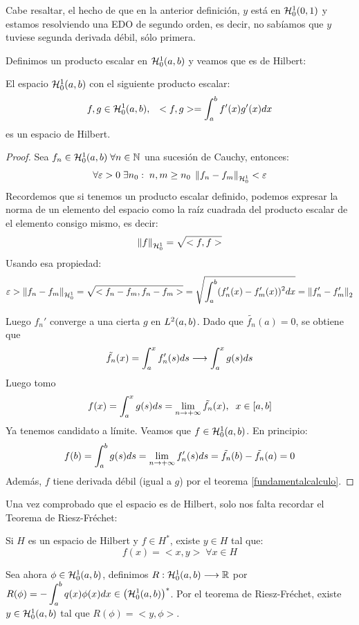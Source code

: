 Cabe resaltar, el hecho de que en la anterior definición, $y$ está en $\sobolevcero[0,1]{1}$ y estamos resolviendo una EDO de segundo orden, es decir, no sabíamos que $y$ tuviese segunda derivada débil, sólo primera.

Definimos un producto escalar en $\sobolevcero[a,b]{1}$ y veamos que es de Hilbert:
\begin{prop}
El espacio $\sobolevcero[a,b]{1}$ con el siguiente producto escalar:
\[
f,g\in\sobolevcero[a,b]{1}, \espacio <f,g>=\integral{a}{b}{f'(x)g'(x)dx}
\]
es un espacio de Hilbert.
\end{prop}
\begin{proof}
Sea $f_n\in\sobolevcero{1} \;\forall n\in\N$ una sucesión de Cauchy, entonces:
\[
\forall \varepsilon>0 \; \exists n_0: \; n,m\geq n_0 \; \normasobolevcero{1}{f_n-f_m}<\varepsilon
\]
Recordemos que si tenemos un producto escalar definido, podemos expresar la norma de un elemento del espacio como la raíz cuadrada del producto escalar de el elemento consigo mismo, es decir:
\[
\normasobolevcero{1}{f}=\sqrt{<f,f>}
\]
Usando esa propiedad:
\[
\varepsilon > \normasobolevcero{1}{f_n-f_m}=\sqrt{<f_n-f_m,f_n-f_m>}=\sqrt{\integral{a}{b}{(f_n'(x)-f_m'(x))^2dx}}=\norm{f_n'-f_m'}_2
\]

Luego $f_n'$ converge a una cierta $g$ en $\lebesgue{2}$. Dado que $\tilde{f_n}(a)=0$, se obtiene que
\[
\tilde{f_n}(x)=\integral{a}{x}{f'_n(s)ds}\longrightarrow\integral{a}{x}{g(s)ds}
\]
Luego tomo
\[
f(x)=\integral{a}{x}{g(s)ds}=\limitemasinfinito{n}{\tilde{f_n}(x)}, \;\; x \in[a,b]
\]
Ya tenemos candidato a límite. Veamos que $f\in\sobolevcero{1}$. En principio:
\[
f(b)=\integral{a}{b}{g(s)ds}=\limitemasinfinito{n}{f'_n(s)ds}=\tilde{f_n}(b)-\tilde{f_n}(a)=0
\]
Además, $f$ tiene derivada débil (igual a $g$) por el teorema \ref{fundamentalcalculo}.
\end{proof}

Una vez comprobado que el espacio es de Hilbert, solo nos falta recordar el Teorema de Riesz-Fréchet:
\begin{theorem}
\label{riesz-frechet}
Si $H$ es un espacio de Hilbert y $f\in H^*$, existe $y\in H$ tal que:
\[
f(x)=<x,y> \; \forall x\in H
\]
\end{theorem}

Sea ahora $\phi\in\sobolevcero{1}$, definimos $\funcion{R}{\sobolevcero{1}}{\R}$ por $R(\phi)=-\integral{a}{b}{q(x)\phi(x)dx}\in\left(\sobolevcero{1}\right)^*$. Por el teorema de Riesz-Fréchet, existe $y\in\sobolevcero{1}$ tal que $R(\phi)=<y,\phi>$.

